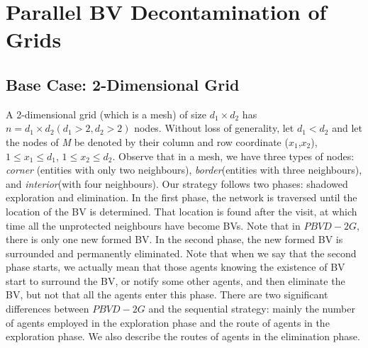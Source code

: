\section{Parallel BV Decontamination of Grids}
\subsection{Base Case: 2-Dimensional Grid}
A 2-dimensional grid (which is a mesh) of size $d_1\times d_2$ has $n=d_1\times d_2 (d_1>2,d_2>2)$ nodes. Without loss of generality, let $d_1<d_2$ and let the nodes of {\em M} be denoted by their column and row coordinate ($x_1$,$x_2$), $1\leq x_1 \leq d_1$, $1\leq x_2 \leq d_2$. Observe that in a mesh, we have three types of nodes: \textit{corner} (entities with only two neighbours), \textit{border}(entities with three neighbours), and \textit{interior}(with four neighbours).  Our strategy follows two phases: shadowed exploration and elimination. In the first phase, the network is traversed until the location of the BV is determined. That location is found after the visit, at which time    all the  unprotected neighbours have become BVs.  Note that in $PBVD-2G$, there is  only one new formed BV. In the second phase, the new formed BV is surrounded and permanently eliminated. Note that when we say that  the second phase starts, we actually mean that those agents knowing the existence of BV start to surround the BV, or notify some other agents, and then eliminate the BV, but not   that all the agents enter this phase. There are two significant differences between $PBVD-2G$ and the sequential strategy: mainly the number of agents employed in the exploration phase and  the route of agents in the exploration phase. We also describe the routes of agents in the elimination phase. \ \\

 \\

